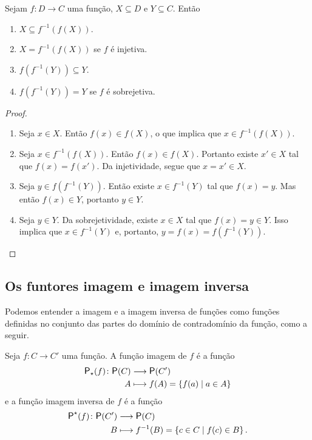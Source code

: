 \begin{proposition}
Sejam $f: D \to C$ uma função, $X \subseteq D$ e $Y \subseteq C$. Então
	\begin{enumerate}
	\item $X \subseteq f^{-1}(f(X))$.
	\item $X = f^{-1}(f(X))$ se $f$ é injetiva.
	\item $f(f^{-1}(Y)) \subseteq Y$.
	\item $f(f^{-1}(Y)) = Y$ se $f$ é sobrejetiva.
	\end{enumerate}
\end{proposition}
\begin{proof}
	\begin{enumerate}
	\item Seja $x \in X$. Então $f(x) \in f(X)$, o que implica que $x \in f^{-1}(f(X))$.
	
	\item Seja $x \in f^{-1}(f(X))$. Então $f(x) \in f(X)$. Portanto existe $x' \in X$ tal que $f(x)=f(x')$. Da injetividade, segue que $x=x' \in X$.
	
	\item Seja $y \in f(f^{-1}(Y))$. Então existe $x \in f^{-1}(Y)$ tal que $f(x)=y$. Mas então $f(x) \in Y$, portanto $y \in Y$.
	
	\item Seja $y \in Y$. Da sobrejetividade, existe $x \in X$ tal que $f(x)=y \in Y$. Isso implica que $x \in f^{-1}(Y)$ e, portanto, $y=f(x)=f(f^{-1}(Y))$.
	\end{enumerate}
\end{proof}



\subsection{Os funtores imagem e imagem inversa}

Podemos entender a imagem e a imagem inversa de funções como funções definidas no conjunto das partes do domínio de contradomínio da função, como a seguir.

Seja $f\colon C \to C'$ uma função. A função imagem de $f$ é a função
	\begin{align*}
	\func{\p\emp(f)}{\p(C)}{\p(C')}{A}{f(A) = \set{f(a)}{a \in A}}
	\end{align*}
e a função imagem inversa de $f$ é a função
	\begin{align*}
	\func{\p\pux(f)}{\p(C')}{\p(C)}{B}{f\inv(B) = \set{c \in C}{f(c) \in B}.}
	\end{align*}

